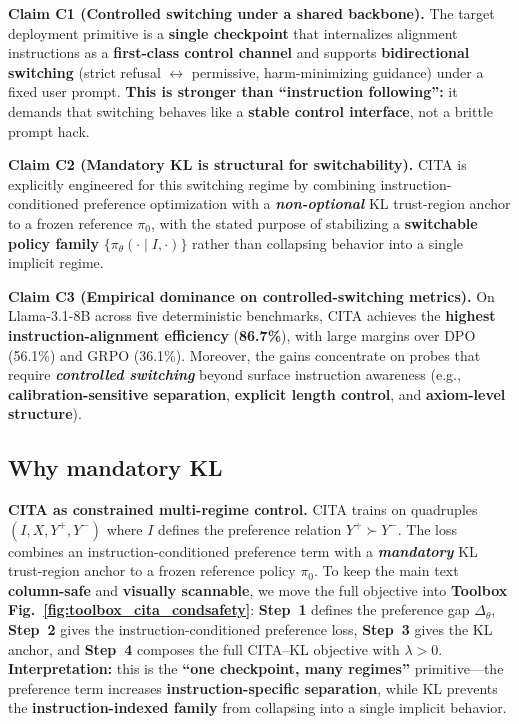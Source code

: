 \noindent\textbf{Claim C1 (Controlled switching under a shared backbone).}
The target deployment primitive is a \textbf{single checkpoint} that internalizes alignment instructions as a \textbf{first-class control channel} and supports \textbf{bidirectional switching} (strict refusal $\leftrightarrow$ permissive, harm-minimizing guidance) under a fixed user prompt. \textbf{This is stronger than ``instruction following'':} it demands that switching behaves like a \textbf{stable control interface}, not a brittle prompt hack.

\noindent\textbf{Claim C2 (Mandatory KL is structural for switchability).}
CITA is explicitly engineered for this switching regime by combining instruction-conditioned preference optimization with a \textbf{\emph{non-optional}} KL trust-region anchor to a frozen reference $\pi_0$, with the stated purpose of stabilizing a \textbf{switchable policy family} $\{\pi_\theta(\cdot\mid I,\cdot)\}$ rather than collapsing behavior into a single implicit regime.

\noindent\textbf{Claim C3 (Empirical dominance on controlled-switching metrics).}
On Llama-3.1-8B across five deterministic benchmarks, CITA achieves the \textbf{highest instruction-alignment efficiency} (\textbf{86.7\%}), with large margins over DPO (56.1\%) and GRPO (36.1\%). Moreover, the gains concentrate on probes that require \textbf{\emph{controlled switching}} beyond surface instruction awareness (e.g., \textbf{calibration-sensitive separation}, \textbf{explicit length control}, and \textbf{axiom-level structure}).


\vspace{-0.35em}
\subsection{Why mandatory KL}
\vspace{-0.2em}

\noindent\textbf{CITA as constrained multi-regime control.}
CITA trains on quadruples $(I,X,Y^+,Y^-)$ where $I$ defines the preference relation $Y^+\succ Y^-$. The loss combines an instruction-conditioned preference term with a \textbf{\emph{mandatory}} KL trust-region anchor to a frozen reference policy $\pi_0$. To keep the main text \textbf{column-safe} and \textbf{visually scannable}, we move the full objective into \textbf{Toolbox Fig.~\ref{fig:toolbox_cita_condsafety}}: \textbf{Step~1} defines the preference gap $\Delta_\theta$, \textbf{Step~2} gives the instruction-conditioned preference loss, \textbf{Step~3} gives the KL anchor, and \textbf{Step~4} composes the full CITA--KL objective with $\lambda>0$. \textbf{Interpretation:} this is the \textbf{``one checkpoint, many regimes''} primitive---the preference term increases \textbf{instruction-specific separation}, while KL prevents the \textbf{instruction-indexed family} from collapsing into a single implicit behavior.


